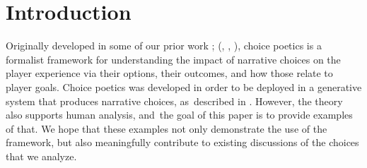 \documentclass[arts,article,accept,moreauthors,pdftex,10pt,a4paper]{Definitions/mdpi}
\begin{document}
\maketitle

\section{Introduction}

Originally developed in some of our prior work \citep{mawhorter2016artificial}; \citeauthor{mawhorter2014towards} (\citeyear{mawhorter2014towards}, \citeyear{mawhorter2015generating}, \citeyear{mawhorter2015intentionally}), choice poetics is a formalist framework for understanding the impact of narrative choices on the player experience via their options, their outcomes, and how those relate to player goals.
%
Choice poetics was developed in order to be deployed in a generative system that produces narrative choices, as~described in \citep{mawhorter2015generating,mawhorter2016artificial}.
%
However, the theory also supports human analysis, and~the goal of this paper is to provide examples of that.
%
We hope that these examples not only demonstrate the use of the framework, but also meaningfully contribute to existing discussions of the choices that we analyze.
\end{document}
